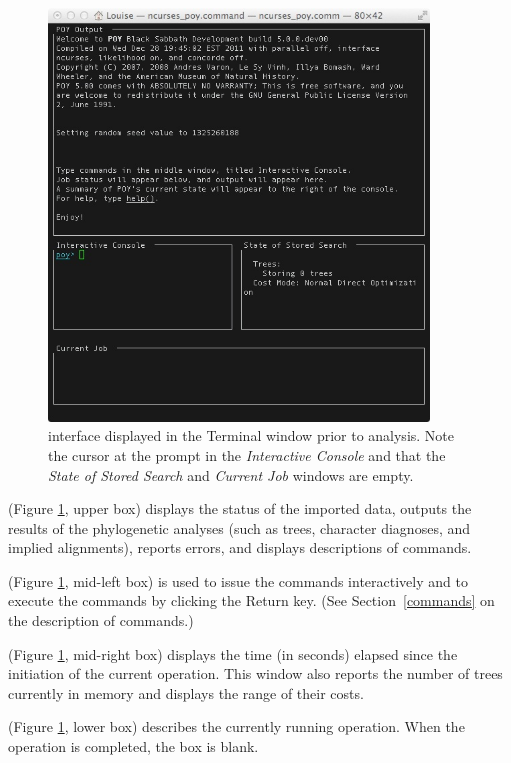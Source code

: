 {\begin{figure}[htbp]
   \centering
   \includegraphics[width=0.9\textwidth]{doc/figures/figinterface.jpg}
   \caption{\poy interface displayed in the Terminal window prior to analysis. Note the cursor at the \poy prompt in the \emph{Interactive Console} and that the \emph{State of Stored Search} and \emph{Current Job} windows are empty.}
   \label{fig:figinterface}
\end{figure}

\begin{description}
\setlength{\labelsep}{5pt}
\setlength{\itemindent}{0pt}%
\item[POY Output] (Figure \ref{fig:figinterface}, upper box) displays the status of the imported data, outputs the results of the phylogenetic analyses (such as trees, character diagnoses, and implied alignments), reports errors, and displays descriptions of \poy commands.
\item[Interactive Console] (Figure \ref{fig:figinterface}, mid-left box) is used to issue the commands interactively and to execute the commands by clicking the Return key. (See Section~\ref{commands} on the description of \poy commands.)
\item[State of Stored Search] (Figure \ref{fig:figinterface}, mid-right box) displays the time (in seconds) elapsed since the initiation of the current operation. This window also reports the number of trees currently in memory and displays the range of their costs.
\item[Current Job] (Figure \ref{fig:figinterface}, lower box) describes the currently running operation. When the operation is completed, the box is blank.
\end{description} 

}
